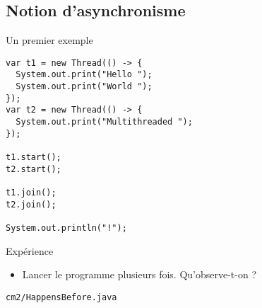 \mode*


\subsection{Notion d'asynchronisme}

\begin{frame}[fragile]{Un premier exemple}

    \begin{lstlisting}[numbers=none]
var t1 = new Thread(() -> {
  System.out.print("Hello ");
  System.out.print("World ");
});
var t2 = new Thread(() -> {
  System.out.print("Multithreaded ");
});
 
t1.start();
t2.start();

t1.join();
t2.join();

System.out.println("!");
    \end{lstlisting}
\vfill
\begin{block}{Expérience}
   \begin{itemize}
      \item Lancer le programme plusieurs fois. Qu'observe-t-on ? 
   \end{itemize}
\end{block}
\begin{citing}
\jitem \lstinline{cm2/HappensBefore.java}
\end{citing}
\end{frame}




